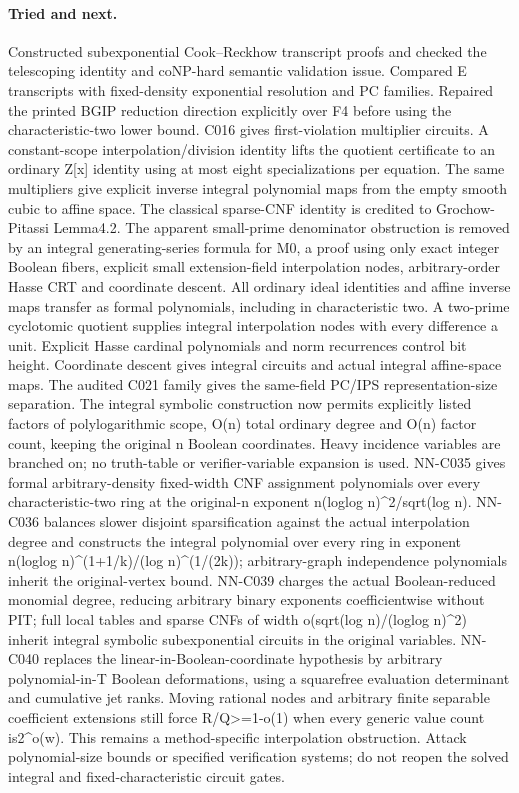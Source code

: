 \paragraph{Tried and next.} Constructed subexponential Cook--Reckhow transcript proofs and checked the telescoping identity and coNP-hard semantic validation issue. Compared E transcripts with fixed-density exponential resolution and PC families. Repaired the printed BGIP reduction direction explicitly over F4 before using the characteristic-two lower bound. C016 gives first-violation multiplier circuits. A constant-scope interpolation/division identity lifts the quotient certificate to an ordinary Z[x] identity using at most eight specializations per equation. The same multipliers give explicit inverse integral polynomial maps from the empty smooth cubic to affine space. The classical sparse-CNF identity is credited to Grochow-Pitassi Lemma4.2. The apparent small-prime denominator obstruction is removed by an integral generating-series formula for M0, a proof using only exact integer Boolean fibers, explicit small extension-field interpolation nodes, arbitrary-order Hasse CRT and coordinate descent. All ordinary ideal identities and affine inverse maps transfer as formal polynomials, including in characteristic two. A two-prime cyclotomic quotient supplies integral interpolation nodes with every difference a unit. Explicit Hasse cardinal polynomials and norm recurrences control bit height. Coordinate descent gives integral circuits and actual integral affine-space maps. The audited C021 family gives the same-field PC/IPS representation-size separation. The integral symbolic construction now permits explicitly listed factors of polylogarithmic scope, O(n) total ordinary degree and O(n) factor count, keeping the original n Boolean coordinates. Heavy incidence variables are branched on; no truth-table or verifier-variable expansion is used. NN-C035 gives formal arbitrary-density fixed-width CNF assignment polynomials over every characteristic-two ring at the original-n exponent n(loglog n)\textasciicircum{}2/sqrt(log n). NN-C036 balances slower disjoint sparsification against the actual interpolation degree and constructs the integral polynomial over every ring in exponent n(loglog n)\textasciicircum{}(1+1/k)/(log n)\textasciicircum{}(1/(2k)); arbitrary-graph independence polynomials inherit the original-vertex bound. NN-C039 charges the actual Boolean-reduced monomial degree, reducing arbitrary binary exponents coefficientwise without PIT; full local tables and sparse CNFs of width o(sqrt(log n)/(loglog n)\textasciicircum{}2) inherit integral symbolic subexponential circuits in the original variables. NN-C040 replaces the linear-in-Boolean-coordinate hypothesis by arbitrary polynomial-in-T Boolean deformations, using a squarefree evaluation determinant and cumulative jet ranks. Moving rational nodes and arbitrary finite separable coefficient extensions still force R/Q>=1-o(1) when every generic value count is2\textasciicircum{}o(w). This remains a method-specific interpolation obstruction. Attack polynomial-size bounds or specified verification systems; do not reopen the solved integral and fixed-characteristic circuit gates.

